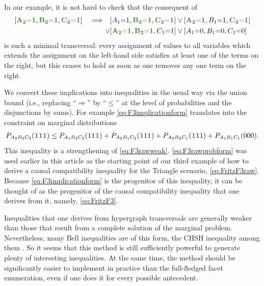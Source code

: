 \documentclass[aps,english,superscriptaddress,onecolumn,twoside,longbibliography,pra,floatfix,fleqn,nofootinbib]{revtex4-1}%
\newcommand*{\mgreen}[1]{{\color{OliveGreen}{\mathbf{#1}}}}
\theoremstyle{definition}
\newcounter{example}[section]
\newcommand{\cramp}[1]{\ensuremath{\mathord{#1}}}
\newcommand{\eql}{\cramp{=}}
\DeclarePairedDelimiter{\parens}{\lparen}{\rparen}
\DeclarePairedDelimiter{\bracks}{\lbrack}{\rbrack}
\begin{document}
In our example, it is not hard to check that the consequent of
\begin{align}\begin{split}\label{eq:F3implicationform}
	\bracks{\mgreen{A_2 \eql 1}, \mgreen{B_2 \eql 1}, \mgreen{C_2 \eql 1}}  \quad\Longrightarrow\quad & \bracks{A_1 \eql 1, \mgreen{B_2 \eql 1}, \mgreen{C_2 \eql 1}} \lor \bracks{\mgreen{A_2 \eql 1}, B_1 \eql 1, \mgreen{C_2 \eql 1}} \\
	 \lor & \bracks{\mgreen{A_2 \eql 1}, \mgreen{B_2 \eql 1}, C_1 \eql 1} \lor \bracks{A_1 \eql 0, B_1 \eql 0, C_1 \eql 0}
\end{split}\end{align}
is such a minimal transversal: every assignment of values to all variables which extends the assignment on the left-hand side satisfies at least one of the terms on the right, but this ceases to hold as soon as one removes any one term on the right. 

We convert these implications into inequalities in the usual way via the union bound (i.e., replacing ``$\Rightarrow$'' by ``$\leq$'' at the level of probabilities and the disjunctions by sums). For example \cref{eq:F3implicationform} translates into the constraint on marginal distributions
\begin{align}\label{eq:F3rawprobform}
    P_{A_2 B_2 C_2}\parens{\mgreen{1} \mgreen{1} \mgreen{1}} \leq P_{A_1 B_2 C_2}\parens{1 \mgreen{1 1}}+P_{A_2 B_1 C_2}\parens{\mgreen{1} 1 \mgreen{1}}+P_{A_2 B_2 C_1}\parens{\mgreen{1 1} 1} + P_{A_1 B_1 C_1}\parens{0 0 0}.
\end{align}
This inequality is a strengthening of \cref{eq:F3rawweak}.  \cref{eq:F3rawprobform} was used earlier in this article as the starting point of our third example of how to derive a causal compatibility inequality for the Triangle scenario, \cref{eq:FritzF3raw}. Because \cref{eq:F3implicationform} is the progenitor of this inequality, it can be thought of as the progenitor of the causal compatibility inequality that one derives from it, namely, \cref{eq:FritzF3}.  

Inequalities that one derives from hypergraph transversals are generally weaker than those that result from a complete solution of the marginal problem. Nevertheless, many Bell inequalities are of this form, the CHSH inequality among them \cite{Ghirardi08}.  So it seems that this method is still sufficiently powerful to generate plenty of interesting inequalities. At the same time, the method should be significantly easier to implement in practice than the full-fledged facet enumeration, even if one does it for every possible antecedent.
\end{document}
